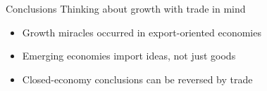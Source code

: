 \documentclass[10pt,notes=hide]{beamer}
\begin{document}
\begin{frame}{Conclusions}
Thinking about growth with trade in mind
\begin{itemize}
\item Growth miracles occurred in export-oriented economies
\item Emerging economies import ideas, not just goods
\item Closed-economy conclusions can be reversed by trade
\end{itemize}
\end{frame}
\end{document}
